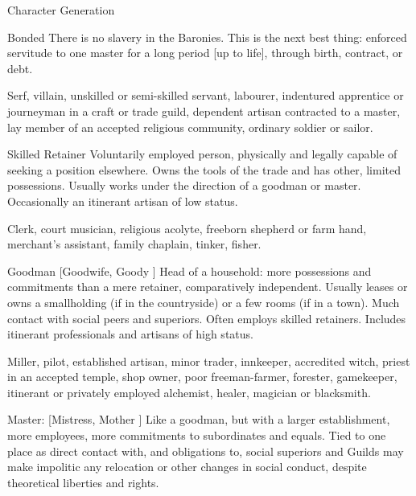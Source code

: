 \begin{Chapter}{Character Generation}
\begin{Description}
\item[Bonded] There is no slavery in the Baronies. This is the next
  best thing: enforced servitude to one master for a long period [up
    to life], through birth, contract, or debt.
  
  \begin{example}
    Serf, villain, unskilled or semi-skilled servant, labourer,
    indentured apprentice or journeyman in a craft or trade guild,
    dependent artisan contracted to a master, lay member of an
    accepted religious community, ordinary soldier or sailor.
  \end{example}

\item[Skilled Retainer] Voluntarily employed person, physically and
  legally capable of seeking a position elsewhere.  Owns the tools of
  the trade and has other, limited possessions. Usually works under
  the direction of a goodman or master. Occasionally an itinerant
  artisan of low status.

  \begin{example}
    Clerk, court musician, religious acolyte, freeborn shepherd or
    farm hand, merchant’s assistant, family chaplain, tinker, fisher.
  \end{example}

  \item[Goodman [Goodwife, Goody]] Head of a household: more
    possessions and commitments than a mere retainer, comparatively
    independent.  Usually leases or owns a smallholding (if in the
    countryside) or a few rooms (if in a town).  Much contact with
    social peers and superiors.  Often employs skilled retainers.
    Includes itinerant professionals and artisans of high status.

    \begin{example} 
      Miller, pilot, established artisan, minor trader, innkeeper,
      accredited witch, priest in an accepted temple, shop owner, poor
      freeman-farmer, forester, gamekeeper, itinerant or privately
      employed alchemist, healer, magician or blacksmith.
    \end{example}
    
\item[Master: [Mistress, Mother]] Like a goodman, but with a larger
  establishment, more employees, more commitments to subordinates and
  equals.  Tied to one place as direct contact with, and obligations
  to, social superiors and Guilds may make impolitic any relocation or
  other changes in social conduct, despite theoretical liberties and
  rights.


\end{Description}
\end{Chapter}
